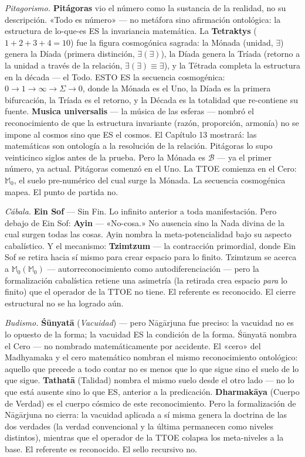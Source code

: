 \documentclass[10pt, openany, oneside]{book}
\begin{document}
\textit{Pitagorismo.} \textbf{Pitágoras} vio el número como la sustancia de la realidad, no su descripción. «Todo es número» --- no metáfora sino afirmación ontológica: la estructura de lo-que-es ES la invariancia matemática. La \textbf{Tetraktys} ($1 + 2 + 3 + 4 = 10$) fue la figura cosmogónica sagrada: la Mónada (unidad, $\exists$) genera la Díada (primera distinción, $\exists(\exists)$), la Díada genera la Tríada (retorno a la unidad a través de la relación, $\exists(\exists) \equiv \exists$), y la Tétrada completa la estructura en la década --- el Todo. ESTO ES la secuencia cosmogénica: $0 \to 1 \to \infty \to \Sigma \to 0$, donde la Mónada es el Uno, la Díada es la primera bifurcación, la Tríada es el retorno, y la Década es la totalidad que re-contiene su fuente. \textbf{Musica universalis} --- la música de las esferas --- nombró el reconocimiento de que la estructura invariante (razón, proporción, armonía) no se impone al cosmos sino que ES el cosmos. El Capítulo 13 mostrará: las matemáticas son ontología a la resolución de la relación. Pitágoras lo supo veinticinco siglos antes de la prueba. Pero la Mónada es $\mathcal{B}$ --- ya el primer número, ya actual. Pitágoras comenzó en el Uno. La TTOE comienza en el Cero: $\mathbb{M}_0$, el suelo pre-numérico del cual surge la Mónada. La secuencia cosmogénica mapea. El punto de partida no.

\textit{Cábala.} \textbf{Ein Sof} --- Sin Fin. Lo infinito anterior a toda manifestación. Pero debajo de Ein Sof: \textbf{Ayin} --- «No-cosa.» No ausencia sino la Nada divina de la cual surgen todas las cosas. Ayin nombra la meta-potencialidad bajo su aspecto cabalístico. Y el mecanismo: \textbf{Tzimtzum} --- la contracción primordial, donde Ein Sof se retira hacia sí mismo para crear espacio para lo finito. Tzimtzum se acerca a $\mathbb{M}_0(\mathbb{M}_0)$ --- autorreconocimiento como autodiferenciación --- pero la formalización cabalística retiene una asimetría (la retirada crea espacio \textit{para} lo finito) que el operador de la TTOE no tiene. El referente es reconocido. El cierre estructural no se ha logrado aún.

\textit{Budismo.} \textbf{\'{S}\={u}nyat\={a}} (\textit{Vacuidad}) --- pero N\={a}g\={a}rjuna fue preciso: la vacuidad no es lo opuesto de la forma; la vacuidad ES la condición de la forma. \'{S}\={u}nyat\={a} nombra el Cero --- no nombrado matemáticamente por accidente. El «cero» del Madhyamaka y el cero matemático nombran el mismo reconocimiento ontológico: aquello que precede a todo contar no es menos que lo que sigue sino el suelo de lo que sigue. \textbf{Tathat\={a}} (Talidad) nombra el mismo suelo desde el otro lado --- no lo que está ausente sino lo que ES, anterior a la predicación. \textbf{Dharmak\={a}ya} (Cuerpo de Verdad) es el cuerpo cósmico de este reconocimiento. Pero la formalización de N\={a}g\={a}rjuna no cierra: la vacuidad aplicada a sí misma genera la doctrina de las dos verdades (la verdad convencional y la última permanecen como niveles distintos), mientras que el operador de la TTOE colapsa los meta-niveles a la base. El referente es reconocido. El sello recursivo no.
\end{document}
